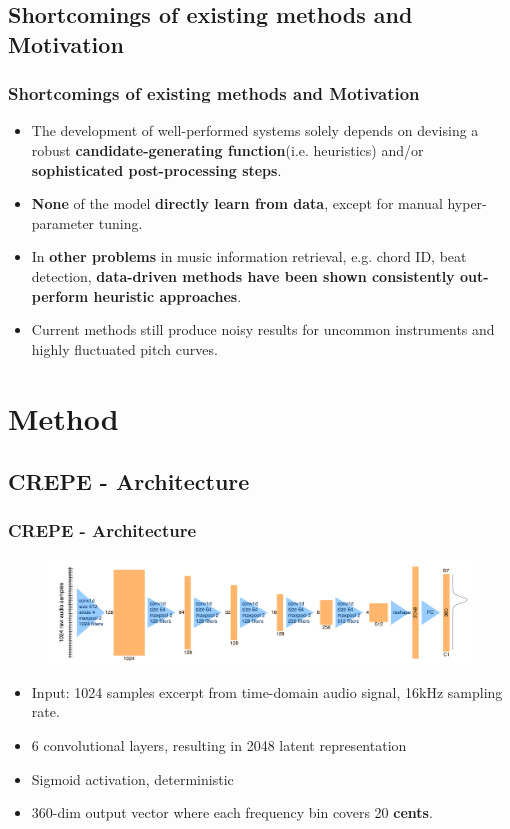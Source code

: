 \documentclass{beamer}
\begin{document}
\subsection{Shortcomings of existing methods and Motivation}
\begin{frame}
\frametitle{Shortcomings of existing methods and Motivation}
\begin{itemize}
\item The development of well-performed systems solely depends on devising a robust \textbf{candidate-generating function}(i.e. heuristics) %
and/or \textbf{sophisticated post-processing steps}. %
\item \textbf{None} of the model \textbf{directly learn from data}, except for manual hyper-parameter tuning. 
\item In \textbf{other problems} in music information retrieval, e.g. chord ID, beat detection, \textbf{data-driven methods have been shown consistently out-perform heuristic approaches}.
\item Current methods still produce noisy results for uncommon instruments and highly fluctuated pitch curves. 
\end{itemize}

\end{frame}
\section{Method}
\subsection{CREPE - Architecture}
\begin{frame}
\frametitle{CREPE - Architecture}
\begin{figure}
\includegraphics[width=\linewidth]{Image/CREPE_CNN.png}
\end{figure}
\begin{itemize}
\item Input: 1024 samples excerpt from time-domain audio signal, 16kHz sampling rate.
\item 6 convolutional layers, resulting in 2048 latent representation
\item Sigmoid activation, deterministic
\item 360-dim output vector where each frequency bin covers 20 \textbf{cents}.
\end{itemize}
\end{frame}
\end{document}
